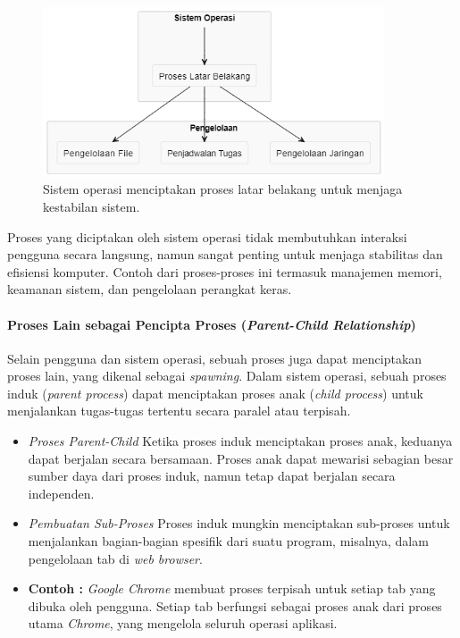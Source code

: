 \documentclass[12pt]{article}
\begin{document}
\begin{figure}[h]
    \centering
    \includegraphics[width=0.9\textwidth]{asset/os background process creation.png}
    \caption{Sistem operasi menciptakan proses latar belakang untuk menjaga kestabilan sistem.}
\end{figure}

Proses yang diciptakan oleh sistem operasi tidak membutuhkan interaksi pengguna secara langsung, namun sangat penting untuk menjaga stabilitas dan efisiensi komputer. Contoh dari proses-proses ini termasuk manajemen memori, keamanan sistem, dan pengelolaan perangkat keras.

\paragraph{Proses Lain sebagai Pencipta Proses (\textit{Parent-Child Relationship})}

Selain pengguna dan sistem operasi, sebuah proses juga dapat menciptakan proses lain, yang dikenal sebagai \textit{spawning}. Dalam sistem operasi, sebuah proses induk (\textit{parent process}) dapat menciptakan proses anak (\textit{child process}) untuk menjalankan tugas-tugas tertentu secara paralel atau terpisah.

\begin{itemize}
    \item \textit{Proses Parent-Child} Ketika proses induk menciptakan proses anak, keduanya dapat berjalan secara bersamaan. Proses anak dapat mewarisi sebagian besar sumber daya dari proses induk, namun tetap dapat berjalan secara independen.
    \item \textit{Pembuatan Sub-Proses} Proses induk mungkin menciptakan sub-proses untuk menjalankan bagian-bagian spesifik dari suatu program, misalnya, dalam pengelolaan tab di \textit{web browser}.
    \item \textbf{Contoh :} \textit{Google Chrome} membuat proses terpisah untuk setiap tab yang dibuka oleh pengguna. Setiap tab berfungsi sebagai proses anak dari proses utama \textit{Chrome}, yang mengelola seluruh operasi aplikasi.
\end{itemize}
\end{document}
